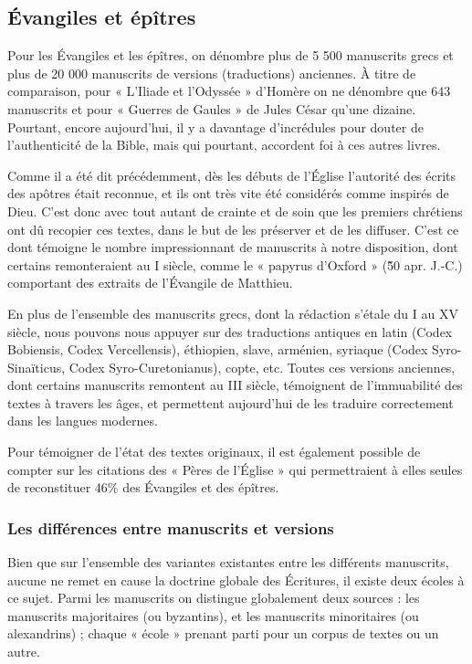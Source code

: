 \begin{small}
\subsection*{Évangiles et épîtres}

Pour les Évangiles et les épîtres, on dénombre plus de 5 500 manuscrits grecs et plus de 20 000 manuscrits de versions (traductions) anciennes. À titre de comparaison, pour « L'Iliade et l'Odyssée » d'Homère on ne dénombre que 643 manuscrits et pour « Guerres de Gaules » de Jules César qu'une dizaine. Pourtant, encore aujourd'hui, il y a davantage d'incrédules pour douter de l'authenticité de la Bible, mais qui pourtant, accordent foi à ces autres livres.\bigskip

Comme il a été dit précédemment, dès les débuts de l'Église l'autorité des écrits des apôtres était reconnue, et ils ont très vite été considérés comme inspirés de Dieu. C'est donc avec tout autant de crainte et de soin que les premiers chrétiens ont dû recopier ces textes, dans le but de les préserver et de les diffuser. C'est ce dont témoigne le nombre impressionnant de manuscrits à notre disposition, dont certains remonteraient au I siècle, comme le « papyrus d'Oxford » (\~50 apr. J.-C.) comportant des extraits de l'Évangile de Matthieu.\bigskip

En plus de l'ensemble des manuscrits grecs, dont la rédaction s'étale du I au XV siècle, nous pouvons nous appuyer sur des traductions antiques en latin (Codex Bobiensis, Codex Vercellensis), éthiopien, slave, arménien, syriaque (Codex Syro-Sinaïticus, Codex Syro-Curetonianus), copte, etc. Toutes ces versions anciennes, dont certains manuscrits remontent au III siècle, témoignent de l'immuabilité des textes à travers les âges, et permettent aujourd'hui de les traduire correctement dans les langues modernes.\bigskip

Pour témoigner de l'état des textes originaux, il est également possible de compter sur les citations des « Pères de l'Église » qui permettraient à elles seules de reconstituer 46\% des Évangiles et des épîtres.

\subsubsection*{Les différences entre manuscrits et versions}

Bien que sur l'ensemble des variantes existantes entre les différents manuscrits, aucune ne remet en cause la doctrine globale des Écritures, il existe deux écoles à ce sujet. Parmi les manuscrits on distingue globalement deux sources : les manuscrits majoritaires (ou byzantins), et les manuscrits minoritaires (ou alexandrins) ; chaque « école » prenant parti pour un corpus de textes ou un autre.\bigskip


\end{small}
